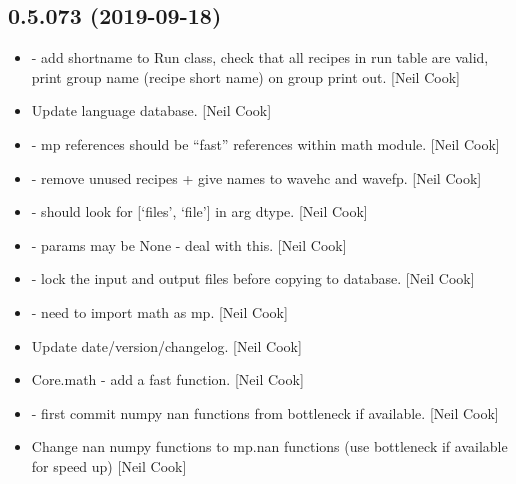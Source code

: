 \documentclass[a4paper,10pt,english]{report}
\begin{document}
\subsection{0.5.073 (2019-09-18)}
\label{\detokenize{misc/changelog:id70}}\begin{itemize}
\item {} 
 - add shortname to Run class,
check that all recipes in run table are valid, print group name
(recipe short name) on group print out. {[}Neil Cook{]}

\item {} 
Update language database. {[}Neil Cook{]}

\item {} 
 - mp references should be “fast” references within
math module. {[}Neil Cook{]}

\item {} 
 - remove unused recipes + give names to
wavehc and wavefp. {[}Neil Cook{]}

\item {} 
 -  should look for {[}‘files’,
‘file’{]} in arg dtype. {[}Neil Cook{]}

\item {} 
 - params may be None - deal with this. {[}Neil
Cook{]}

\item {} 
 - lock the input and output files before copying to
database. {[}Neil Cook{]}

\item {} 
 - need to import math as mp. {[}Neil
Cook{]}

\item {} 
Update date/version/changelog. {[}Neil Cook{]}

\item {} 
Core.math - add a fast  function. {[}Neil Cook{]}

\item {} 
 - first commit numpy nan functions from bottleneck
if available. {[}Neil Cook{]}

\item {} 
Change nan numpy functions to mp.nan functions (use bottleneck if
available for speed up) {[}Neil Cook{]}


\end{itemize}
\end{document}
